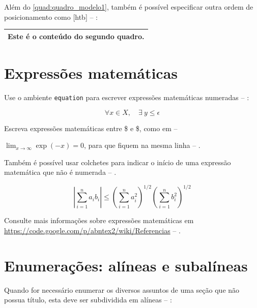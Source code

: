 Além do \autoref{quad:quadro_modelo1}, também é possível especificar outra ordem
de posicionamento como [htb] -- \showfont:

\begin{quadro}[htb]
\caption[Legenda do segundo quadro.]{Legenda do segundo quadro. -- \showfont}
\label{quad:quadro_modelo2}
\centering
\begin{tabular}{|c|}
\hline
Este é o conteúdo do segundo quadro.\\
\hline
\end{tabular}
\end{quadro}

\section{Expressões matemáticas}

 Use o ambiente \texttt{equation} para escrever
expressões matemáticas numeradas -- \showfont:

\begin{equation}
  \forall x \in X, \quad \exists \: y \leq \epsilon
\end{equation}

Escreva expressões matemáticas entre \$ e \$, como em -- \showfont

 $\lim_{x \to \infty}
\exp(-x) = 0 $, para que fiquem na mesma linha -- \showfont.

Também é possível usar colchetes para indicar o início de uma expressão
matemática que não é numerada -- \showfont.

\[
\left|\sum_{i=1}^n a_ib_i\right|
\le
\left(\sum_{i=1}^n a_i^2\right)^{1/2}
\left(\sum_{i=1}^n b_i^2\right)^{1/2}
\]

Consulte mais informações sobre expressões matemáticas em
\url{https://code.google.com/p/abntex2/wiki/Referencias} -- \showfont.

\section{Enumerações: alíneas e subalíneas}

Quando for necessário enumerar
os diversos assuntos de uma seção que não possua título, esta deve ser
subdividida em alíneas -- \showfont \cite[4.2]{NBR6024:2012}:


